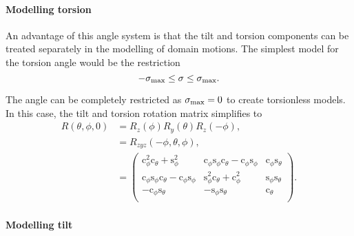 


\paragraph{Modelling torsion}

An advantage of this angle system is that the tilt and torsion components can be treated separately in the modelling of domain motions.
The simplest model for the torsion angle would be the restriction
\begin{equation} \label{eq: torsion angle restriction}
    -\sigma_\textrm{max} \le \sigma \le \sigma_\textrm{max} .
\end{equation}

The angle can be completely restricted as $\sigma_\textrm{max} = 0$ to create torsionless models.
In this case, the tilt and torsion rotation matrix simplifies to
\begin{subequations}
\begin{align}
    R(\theta, \phi, 0)
        &= R_z(\phi)R_y(\theta)R_z(-\phi) , \\
        &= R_{zyz}(-\phi, \theta, \phi) , \\
        &= \begin{pmatrix}
            \mathrm{c}^2_\phi \mathrm{c}_\theta + \mathrm{s}^2_\phi                                 & \mathrm{c}_\phi \mathrm{s}_\phi \mathrm{c}_\theta - \mathrm{c}_{\phi} \mathrm{s}_\phi & \mathrm{c}_\phi \mathrm{s}_\theta \\
            \mathrm{c}_{\phi} \mathrm{s}_\phi \mathrm{c}_\theta - \mathrm{c}_\phi \mathrm{s}_{\phi} & \mathrm{s}^2_\phi \mathrm{c}_\theta + \mathrm{c}^2_\phi                               & \mathrm{s}_\phi \mathrm{s}_\theta \\
            -\mathrm{c}_{\phi} \mathrm{s}_\theta                                                    & -\mathrm{s}_{\phi} \mathrm{s}_\theta                                                  & \mathrm{c}_\theta \\
        \end{pmatrix} . \label{eq: R matrix torsionless}
\end{align}
\end{subequations}



\paragraph{Modelling tilt}

